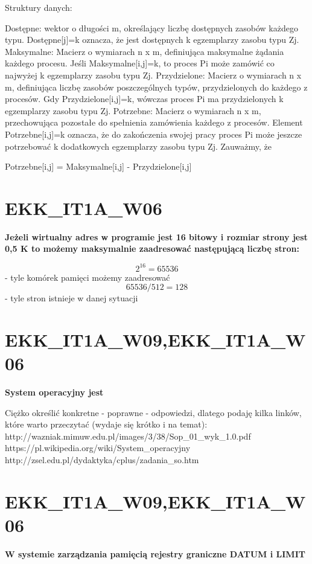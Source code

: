 Struktury danych:

Dostępne: wektor o długości m, określający liczbę dostępnych zasobów każdego typu. Dostępne[j]=k oznacza, że jest dostępnych k egzemplarzy zasobu typu Zj.
Maksymalne: Macierz o wymiarach n x m, definiująca maksymalne żądania każdego procesu. Jeśli Maksymalne[i,j]=k, to proces Pi może zamówić co najwyżej k egzemplarzy zasobu typu Zj.
Przydzielone: Macierz o wymiarach n x m, definiująca liczbę zasobów poszczególnych typów, przydzielonych do każdego z procesów. Gdy Przydzielone[i,j]=k, wówczas proces Pi ma przydzielonych k egzemplarzy zasobu typu Zj.
Potrzebne: Macierz o wymiarach n x m, przechowująca pozostałe do spełnienia zamówienia każdego z procesów. Element Potrzebne[i,j]=k oznacza, że do zakończenia swojej pracy proces Pi może jeszcze potrzebować k dodatkowych egzemplarzy zasobu typu Zj. Zauważmy, że

       Potrzebne[i,j] = Maksymalne[i,j] - Przydzielone[i,j]



\section{EKK\_IT1A\_W06}
\textbf{Jeżeli wirtualny adres w programie jest 16 bitowy i rozmiar strony jest 0,5 K to możemy maksymalnie zaadresować następującą liczbę stron:}

\vspace{0.4cm}

$$ 2^{16} = 65536 $$ - tyle komórek pamięci możemy zaadresować
$$ 65536 / 512 = 128 $$ - tyle stron istnieje w danej sytuacji



\section{EKK\_IT1A\_W09,EKK\_IT1A\_W06}
\textbf{System operacyjny jest}

\vspace{0.4cm}
Ciężko określić konkretne - poprawne - odpowiedzi, dlatego podaję kilka linków, które warto przeczytać (wydaje się krótko i na temat):
http://wazniak.mimuw.edu.pl/images/3/38/Sop\_01\_wyk\_1.0.pdf 
https://pl.wikipedia.org/wiki/System\_operacyjny
http://zsel.edu.pl/dydaktyka/cplus/zadania\_so.htm 


\section{EKK\_IT1A\_W09,EKK\_IT1A\_W06}
\textbf{W systemie zarządzania pamięcią rejestry graniczne DATUM i LIMIT}


